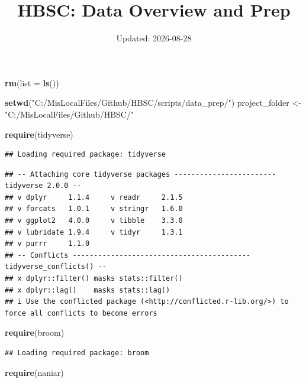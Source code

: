 \documentclass[
]{article}
\title{HBSC: Data Overview and Prep}
\author{}
\date{\vspace{-2.5em}Updated: 2026-08-28}
\newenvironment{Shaded}{\begin{snugshade}}{\end{snugshade}}
\newcommand{\AttributeTok}[1]{\textcolor[rgb]{0.13,0.29,0.53}{#1}}
\newcommand{\FunctionTok}[1]{\textcolor[rgb]{0.13,0.29,0.53}{\textbf{#1}}}
\newcommand{\NormalTok}[1]{#1}
\newcommand{\OtherTok}[1]{\textcolor[rgb]{0.56,0.35,0.01}{#1}}
\newcommand{\StringTok}[1]{\textcolor[rgb]{0.31,0.60,0.02}{#1}}
\begin{document}
\maketitle

\begin{Shaded}
\begin{Highlighting}[]
\FunctionTok{rm}\NormalTok{(}\AttributeTok{list =} \FunctionTok{ls}\NormalTok{())}

\FunctionTok{setwd}\NormalTok{(}\StringTok{"C:/MisLocalFiles/Github/HBSC/scripts/data\_prep/"}\NormalTok{)}
\NormalTok{project\_folder }\OtherTok{\textless{}{-}} \StringTok{"C:/MisLocalFiles/Github/HBSC/"}

\FunctionTok{require}\NormalTok{(tidyverse)}
\end{Highlighting}
\end{Shaded}

\begin{verbatim}
## Loading required package: tidyverse
\end{verbatim}

\begin{verbatim}
## -- Attaching core tidyverse packages ------------------------ tidyverse 2.0.0 --
## v dplyr     1.1.4     v readr     2.1.5
## v forcats   1.0.1     v stringr   1.6.0
## v ggplot2   4.0.0     v tibble    3.3.0
## v lubridate 1.9.4     v tidyr     1.3.1
## v purrr     1.1.0     
## -- Conflicts ------------------------------------------ tidyverse_conflicts() --
## x dplyr::filter() masks stats::filter()
## x dplyr::lag()    masks stats::lag()
## i Use the conflicted package (<http://conflicted.r-lib.org/>) to force all conflicts to become errors
\end{verbatim}

\begin{Shaded}
\begin{Highlighting}[]
\FunctionTok{require}\NormalTok{(broom)}
\end{Highlighting}
\end{Shaded}

\begin{verbatim}
## Loading required package: broom
\end{verbatim}

\begin{Shaded}
\begin{Highlighting}[]
\FunctionTok{require}\NormalTok{(naniar)}
\end{Highlighting}
\end{Shaded}
\end{document}
